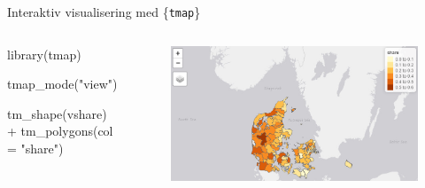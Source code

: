 \documentclass[
  8pt,
  ignorenonframetext,
  aspectratio=169]{beamer}
\newenvironment{Shaded}{}{}
\newcommand{\AttributeTok}[1]{\textcolor[rgb]{0.49,0.56,0.16}{#1}}
\newcommand{\FunctionTok}[1]{\textcolor[rgb]{0.02,0.16,0.49}{#1}}
\newcommand{\NormalTok}[1]{#1}
\newcommand{\SpecialCharTok}[1]{\textcolor[rgb]{0.25,0.44,0.63}{#1}}
\newcommand{\StringTok}[1]{\textcolor[rgb]{0.25,0.44,0.63}{#1}}
\newcommand{\columnsbegin}{\begin{columns}}
\newcommand{\columnsend}{\end{columns}}
\begin{document}
\begin{frame}[fragile]{Interaktiv visualisering med \{\texttt{tmap}\}}
\protect\hypertarget{interaktiv-visualisering-med-tmap-2}{}
\columnsbegin
{}

\tiny

\begin{Shaded}
\begin{Highlighting}[]
\FunctionTok{library}\NormalTok{(tmap)}

\FunctionTok{tmap\_mode}\NormalTok{(}\StringTok{"view"}\NormalTok{)}

\FunctionTok{tm\_shape}\NormalTok{(vshare) }\SpecialCharTok{+}
  \FunctionTok{tm\_polygons}\NormalTok{(}\AttributeTok{col =} \StringTok{"share"}\NormalTok{)}
\end{Highlighting}
\end{Shaded}

\normalsize {}

\begin{figure}[H]
    \centering
    \includegraphics[width=.90\textwidth]{pictures/tmap.png}
\end{figure}

\columnsend
\end{frame}
\end{document}
